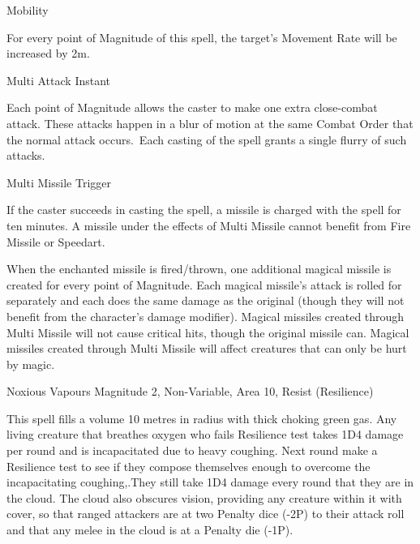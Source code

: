 \begin{rpg-spell}
{Mobility}
{}

For every point of Magnitude of this spell, the target’s Movement Rate will be increased by 2m.
\end{rpg-spell}


\begin{rpg-spell}
{Multi Attack}
{Instant}

Each point of Magnitude allows the caster to make one extra close-combat attack. These attacks happen in a blur of motion at the same Combat Order that the normal attack occurs. Each casting of the spell grants a single flurry of such attacks.
\end{rpg-spell}


\begin{rpg-spell}
{Multi Missile}
{Trigger}

If the caster succeeds in casting the spell, a missile is charged with the spell for ten minutes. A missile under the effects of Multi Missile cannot benefit from Fire Missile or Speedart. 

When the enchanted missile is fired/thrown, one additional magical missile is created for every point of Magnitude. Each magical missile’s attack is rolled for separately and each does the same damage as the original (though they will not benefit from the character’s damage modifier). Magical missiles created through Multi Missile will not cause critical hits, though the original missile can. Magical missiles created through Multi Missile will affect creatures that can only be hurt by magic. 
\end{rpg-spell}


\begin{rpg-spell}
{Noxious Vapours}
{Magnitude 2, Non-Variable, Area 10, Resist (Resilience)}

This spell fills a volume 10 metres in radius with thick choking green gas. Any living creature that breathes oxygen who fails Resilience test takes 1D4 damage per round and is incapacitated due to heavy coughing. Next round make a Resilience test to see if they compose themselves enough to overcome the incapacitating coughing,.They still take 1D4 damage every round that they are in the cloud. The cloud also obscures vision, providing any creature within it with cover, so that ranged attackers are at two Penalty dice (-2P) to their attack roll and that any melee in the cloud is at a Penalty die (-1P).
\end{rpg-spell}


